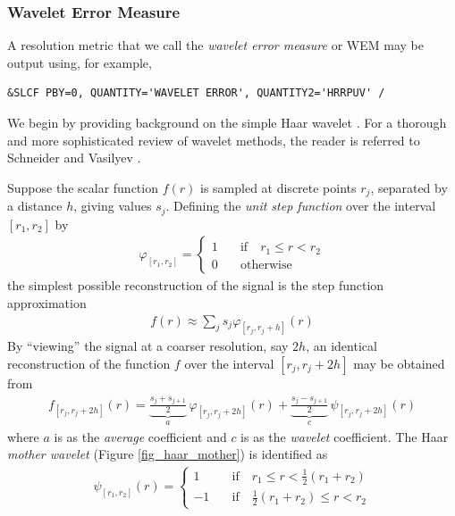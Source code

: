 \documentclass[11pt]{book}
\begin{document}
\subsubsection{Wavelet Error Measure}
\label{wavelets}

A resolution metric that we call the \emph{wavelet error measure} or WEM may be output using, for example,

\begin{lstlisting}
&SLCF PBY=0, QUANTITY='WAVELET ERROR', QUANTITY2='HRRPUV' /
\end{lstlisting}

We begin by providing background on the simple Haar wavelet \cite{Nievergelt:1999}.  For a thorough and more sophisticated review of wavelet methods, the reader is referred to Schneider and Vasilyev \cite{Schneider:2010}.

Suppose the scalar function $f(r)$ is sampled at discrete points $r_j$, separated by a distance $h$, giving values $s_j$.  Defining the \emph{unit step function} over the interval $[r_1,r_2]$ by
\begin{eqnarray}
\varphi_{[r_1,r_2]} = \left\{ \begin{array}{ll} 1 & \quad \mbox{if} \quad r_1 \le r < r_2 \\ 0 & \quad \mbox{otherwise} \end{array} \right.
\end{eqnarray}
the simplest possible reconstruction of the signal is the step function approximation
\begin{eqnarray}
f(r) \approx \sum_j s_j \varphi_{[r_j,r_j+h]}(r)
\end{eqnarray}
By ``viewing'' the signal at a coarser resolution, say $2h$, an identical reconstruction of the function $f$ over the interval $[r_j,r_j+2h]$ may be obtained from
\begin{eqnarray}
\label{eqn_wavelet_decomp}
f_{[r_j,r_j+2h]}(r) = \underbrace{\frac{s_j+s_{j+1}}{2}}_a \,\varphi_{[r_j,r_j+2h]}(r) + \underbrace{\frac{s_j-s_{j+1}}{2}}_c \,\psi_{[r_j,r_j+2h]}(r)
\end{eqnarray}
where $a$ is as the \emph{average} coefficient and $c$ is as the \emph{wavelet} coefficient.  The Haar \emph{mother wavelet} (Figure \ref{fig_haar_mother}) is identified as
\begin{eqnarray}
\psi_{[r_1,r_2]}(r) = \left\{ \begin{array}{ll} 1 & \quad \mbox{if} \quad r_1\le r < \frac{1}{2}(r_1+r_2) \\ -1 & \quad \mbox{if} \quad \frac{1}{2}(r_1+r_2)\le r < r_2 \end{array} \right.
\end{eqnarray}
\end{document}
